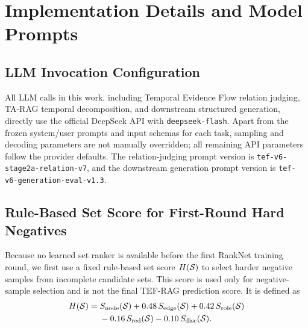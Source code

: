 \section{Implementation Details and Model Prompts}
\label{app:implementation}

\subsection{LLM Invocation Configuration}
\label{app:llm_config}

All LLM calls in this work, including Temporal Evidence Flow relation judging,
TA-RAG temporal decomposition, and downstream structured generation, directly use the official DeepSeek API with \texttt{deepseek-flash}.
Apart from the frozen system/user prompts and input schemas for each task,
sampling and decoding parameters are not manually overridden; all remaining API parameters follow the provider defaults.
The relation-judging prompt version is \texttt{tef-v6-stage2a-relation-v7},
and the downstream generation prompt version is \texttt{tef-v6-generation-eval-v1.3}.


\subsection{Rule-Based Set Score for First-Round Hard Negatives}
\label{app:hand_score}

Because no learned set ranker is available before the first RankNet training round, we first use a fixed rule-based set score
$H(\mathcal{S})$ to select harder negative samples from incomplete candidate sets. This score is used only for negative-sample selection and is not the final TEF-RAG prediction score. It is defined as
\begin{equation}
\begin{aligned}
H(\mathcal{S})
={}&S_{\mathrm{node}}(\mathcal{S})
+0.48\,S_{\mathrm{edge}}(\mathcal{S})
+0.42\,S_{\mathrm{role}}(\mathcal{S})\\
&-0.16\,S_{\mathrm{red}}(\mathcal{S})
-0.10\,S_{\mathrm{disc}}(\mathcal{S}).
\end{aligned}
\label{eq:appendix_hand_score}
\end{equation}

